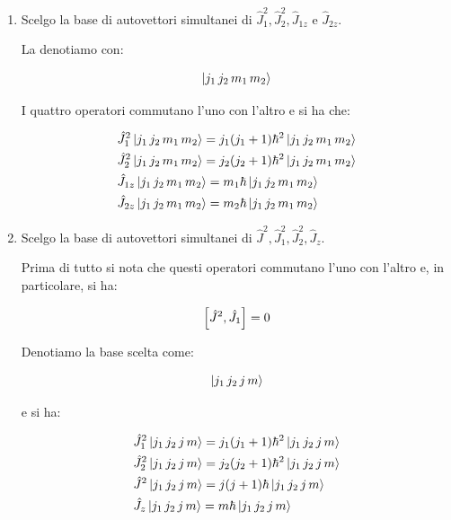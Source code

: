 \begin{enumerate}[label=\arabic*)]
	
	\item Scelgo la base di autovettori simultanei di $\hat{J}_1^2, \hat{J}_2^2, \hat{J}_{1z}$ e $\hat{J}_{2z}$.
	
		La denotiamo con:
	
	\begin{align*}
		\ket{j_1\, j_2 \, m_1\, m_2}
	\end{align*}
	
		I quattro operatori commutano l'uno con l'altro e si ha che:
		
	\begin{align*}
		& \hat{J}_1^2 \ket{j_1 \, j_2 \, m_1 \, m_2 } = j_1 \qty(j_1 + 1) \hbar^2 \ket{j_1 \, j_2 \, m_1 \, m_2} \\
		& \hat{J}_2^2 \ket{j_1 \, j_2 \, m_1 \, m_2 } = j_2 \qty(j_2 + 1) \hbar^2 \ket{j_1 \, j_2 \, m_1 \, m_2} \\
		& \hat{J}_{1z} \ket{j_1 \, j_2 \, m_1 \, m_2 } = m_1 \hbar \ket{j_1 \, j_2 \, m_1 \, m_2 } \\
		& \hat{J}_{2z} \ket{j_1 \, j_2 \, m_1 \, m_2 } = m_2 \hbar \ket{j_1 \, j_2 \, m_1 \, m_2 } 
	\end{align*}
	
	\item Scelgo la base di autovettori simultanei di $\hat{J}^2, \hat{J}_1^2, \hat{J}_2^2, \hat{J}_z$. 
	
		Prima di tutto si nota che questi operatori commutano l'uno con l'altro e, in particolare, si ha:
		
	\begin{align*}
		\qty[\hat{J}^2, \hat{J}_1] = 0
	\end{align*}
	
		Denotiamo la base scelta come:
		
	\begin{align*}
		\ket{j_1 \, j_2 \, j \, m}
	\end{align*}
	
		e si ha:
	
	\begin{align*}
		& \hat{J}_1^2 \ket{j_1 \, j_2 \, j \, m} = j_1 \qty(j_1 + 1) \hbar^2 \ket{j_1 \, j_2 \, j \, m} \\
		& \hat{J}_2^2 \ket{j_1 \, j_2 \, j \, m} = j_2 \qty(j_2 + 1) \hbar^2 \ket{j_1 \, j_2 \, j \, m} \\
		& \hat{J}^2 \ket{j_1 \, j_2 \, j \, m} = j \qty( j +1 ) \hbar \ket{j_1 \, j_2 \, j \, m} \\
		& \hat{J}_{z}\ket{j_1 \, j_2 \, j \, m} = m \hbar \ket{j_1 \, j_2 \, j \, m}
	\end{align*}
	

\end{enumerate}
